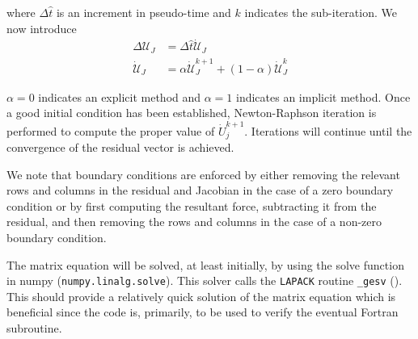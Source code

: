 where $\Delta \hat{t}$ is an increment in pseudo-time and $k$ indicates the sub-iteration. We now introduce
\begin{align*}
\Delta \mathcal{U}_J &= \Delta \hat{t} \dot{\mathcal{U}}_J\\
\dot{\mathcal{U}}_J &= \alpha \dot{\mathcal{U}}_J^{k+1} + \left(1-\alpha\right) \dot{\mathcal{U}}_J^{k}
\end{align*}

$\alpha = 0$ indicates an explicit method and $\alpha = 1$ indicates an implicit method. Once a good initial condition has been established, Newton-Raphson iteration is performed to compute the proper value of $\dot{U}_j^{k+1}$. Iterations will continue until the convergence of the residual vector is achieved.

We note that boundary conditions are enforced by either removing the relevant rows and columns in the residual and Jacobian in the case of a zero boundary condition or by first computing the resultant force, subtracting it from the residual, and then removing the rows and columns in the case of a non-zero boundary condition.

The matrix equation will be solved, at least initially, by using the solve function in numpy (\verb|numpy.linalg.solve|). This solver calls the \verb|LAPACK| routine \verb|_gesv| (\cite{bib:numpy.linalg.solve}). This should provide a relatively quick solution of the matrix equation which is beneficial since the code is, primarily, to be used to verify the eventual Fortran subroutine.

\FloatBarrier